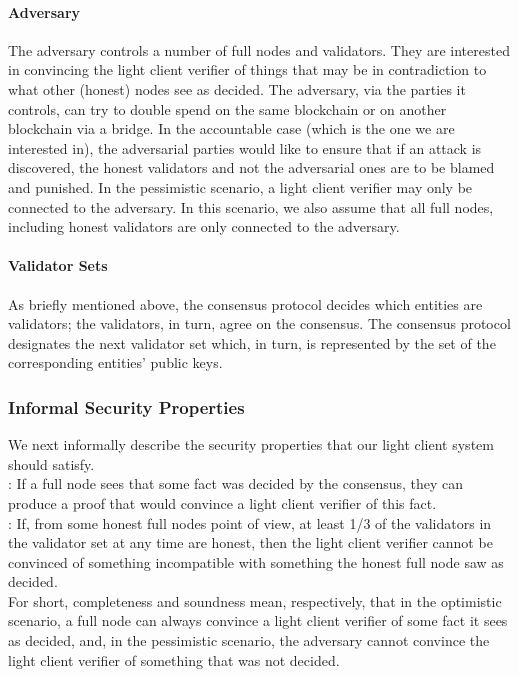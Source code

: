 \paragraph{Adversary} The adversary controls a number of full nodes and validators. They are interested in convincing the light client verifier of things 
that may be in contradiction to what other (honest) nodes see as decided. The adversary, via the parties it controls, can try to  
double spend on the same blockchain or on another blockchain via a bridge. In the accountable case (which is the one we are interested in), 
the adversarial parties would like to ensure that if an attack is discovered, the honest validators and not the adversarial ones are to be blamed and punished.
In the pessimistic scenario, a light client verifier may only be connected to the adversary. In this scenario, we also assume that all full nodes, including honest 
validators are only connected to the adversary.

\paragraph{Validator Sets} As briefly mentioned above, the consensus protocol decides which entities are validators; the validators, in turn, agree on the consensus. 
The consensus protocol designates the next validator set which, in turn, is represented by the set of the corresponding entities' public keys. 

\subsubsection{Informal Security Properties}
\noindent We next informally describe the security properties that our light client system should satisfy. \\

: If a full node sees that some fact was decided by the consensus, they can produce a proof that would convince a light client verifier of this fact.\\

:  If, from some honest full nodes point of view, at least 1/3 of the validators in the validator set at any time are honest, then the light client verifier 
cannot be convinced of something incompatible with something the honest full node saw as decided. \\

\noindent For short, completeness and soundness mean, respectively, that in the optimistic scenario, 
a full node can always convince a light client verifier of some fact it sees as decided, and, in the pessimistic scenario, 
the adversary cannot convince the light client verifier of something that was not decided. \\

